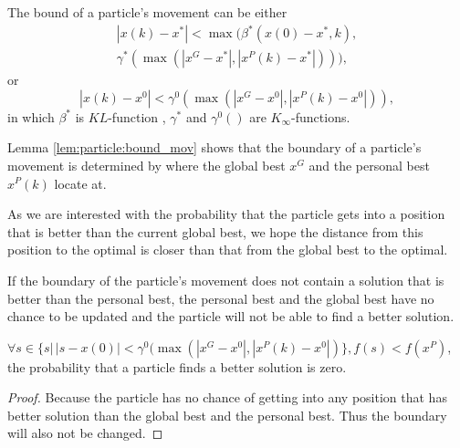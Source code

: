 \begin{mylem}
\label{lem:particle:bound_mov}
The bound of a particle's movement can be either 
\begin{equation}
\begin{aligned}
| x(k) - x^{*} | < \max ( \beta^{*} ( x(0) - x^{*}, k ), \\ \gamma^{*} ( \max ( | x^{G} - x^{*} | , | x^{P}(k) - x^{*}  | ) ) ),
\end{aligned}
\end{equation}
or 
\begin{equation}
| x(k) - x^{0} | < \gamma^{0} ( \max ( | x^{G} - x^{0} | , | x^{P}(k) - x^{0}  | ) ),
\end{equation}
in which $ \beta^{*} $ is $ KL $-function , $ \gamma^{*}  $ and $ \gamma^{0} () $ are $ K_{\infty} $-functions. 
\end{mylem}
Lemma \ref{lem:particle:bound_mov} shows that the boundary of a particle's movement is determined by where the global best $ x^{G} $ and the personal best $ x^{P}(k) $ locate at.

As we are interested with the probability that the particle gets into a position that is better than the current global best, we hope the distance from this position to the optimal is closer than that from the global best to the optimal.

If the boundary of the particle's movement does not contain a solution that is better than the personal best, the personal best and the global best have no chance to be updated and the particle will not be able to find a better solution.
\begin{mythm}
\label{thm:multimodal:out_of_scope}
$ \forall s \in \{ s | \, |s - x(0)| < \gamma^{0} ( \max ( | x^{G} - x^{0} | , | x^{P}(k) - x^{0}  | ) \}, f(s) < f(x^{P})  $, the probability that a particle finds a better solution is zero.
\begin{proof}
Because the particle has no chance of getting into any position that has better solution than the global best and the personal best.
Thus the boundary will also not be changed.
\end{proof}
\end{mythm}

